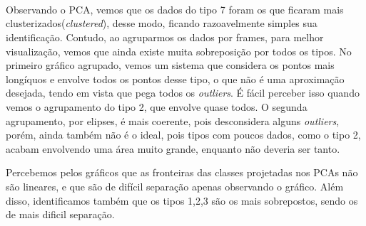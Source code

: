\documentclass[11pt]{article}
\begin{document}
    
    
    
    
    \begin{center}
    \end{center}
    { \hspace*{\fill} \\}
    
    
    
    \begin{center}
    \end{center}
    { \hspace*{\fill} \\}
    
    \begin{center}
    \end{center}
    { \hspace*{\fill} \\}
    
    Observando o PCA, vemos que os dados do tipo 7 foram os que ficaram mais
clusterizados(\emph{clustered}), desse modo, ficando razoavelmente
simples sua identificação. Contudo, ao agruparmos os dados por frames,
para melhor visualização, vemos que ainda existe muita sobreposição por
todos os tipos. No primeiro gráfico agrupado, vemos um sistema que
considera os pontos mais longíquos e envolve todos os pontos desse tipo,
o que não é uma aproximação desejada, tendo em vista que pega todos os
\emph{outliers}. É fácil perceber isso quando vemos o agrupamento do
tipo 2, que envolve quase todos. O segunda agrupamento, por elipses, é
mais coerente, pois desconsidera alguns \emph{outliers}, porém, ainda
também não é o ideal, pois tipos com poucos dados, como o tipo 2, acabam
envolvendo uma área muito grande, enquanto não deveria ser tanto.

Percebemos pelos gráficos que as fronteiras das classes projetadas nos
PCAs não são lineares, e que são de difícil separação apenas observando
o gráfico. Além disso, identificamos também que os tipos 1,2,3 são os
mais sobrepostos, sendo os de mais dificil separação.

    
    
    
    
\end{document}
